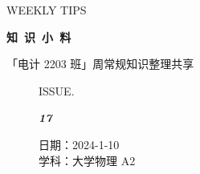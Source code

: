 \documentclass[UTF8]{ctexart}
\newcommand\Black[1]{\textcolor[gray]{0.3}{#1}}
\newcommand\Brown[1]{\textcolor[HTML]{998A4E}{#1}}
\newcommand\IssueNumber{17}
\newcommand\Date{2024-1-10}
\newcommand\Subject{大学物理 A2}
\begin{document}
\BgThispage
\begin{center}
{\scriptsize\Issue \textcolor[HTML]{C8BA83}{WEEKLY TIPS}}

{\Huge\bfseries\TitleFont \Black{知\ 识\ 小\ 料}}

\vspace{-0.1cm}
{\footnotesize \Brown{「电计 2203 班」周常规知识整理共享}}
\end{center}

\vspace{-0.5cm}

\begin{figure}[H]
\hspace{1cm}
\begin{minipage}[t]{0.3\textwidth}
\centering
    \Brown{ISSUE.}

    \vspace{-0.6cm}
    \Huge \Issue\slshape\bfseries\Black{\IssueNumber}
\end{minipage}
\hfill
\begin{minipage}[t]{0.35\textwidth}
\centering
    \Brown{日期：\Date} \\
\vspace{-0.1cm}
    \Brown{学科：\Subject} \\
\end{minipage}
\hspace{0.8cm}
\end{figure}
\end{document}
